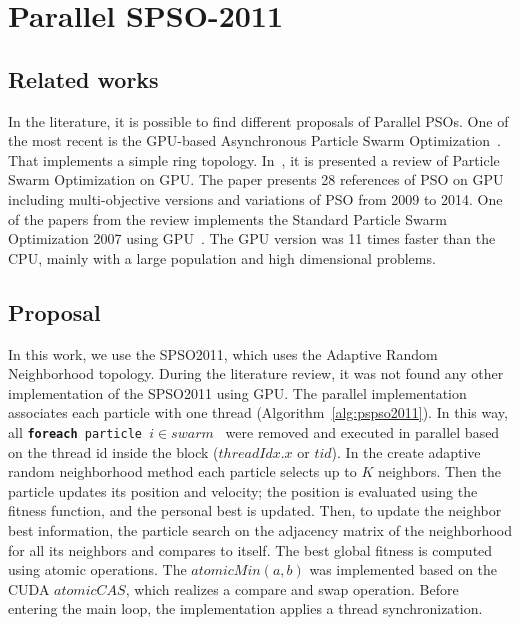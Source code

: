 \documentclass{article}
\begin{document}
    \section{Parallel SPSO-2011}

    \subsection{Related works}

    In the literature, it is possible to find different proposals of Parallel PSOs.
    One of the most recent is the GPU-based Asynchronous Particle Swarm Optimization~\cite{GPUPSO}.
    That implements a simple ring topology.
    In~\cite{ReviewGPUPSO}, it is presented a review of Particle Swarm Optimization on GPU.
    The paper presents 28 references of PSO on GPU including multi-objective versions and variations of PSO from 2009 to 2014.
    One of the papers from the review implements the Standard Particle Swarm Optimization 2007 using GPU~\cite{GPUSPSO2007}. The GPU version was 11 times faster than the CPU, mainly with a large population and high dimensional problems.

    \subsection{Proposal}

    In this work, we use the SPSO2011, which uses the Adaptive Random Neighborhood topology.  
    During the literature review, it was not found any other implementation of the SPSO2011 using GPU.
    The parallel implementation associates each particle with one thread (Algorithm~\ref{alg:pspso2011}).
    In this way, all \texttt{{\bf foreach} particle $ i \in swarm$ } were removed and executed in parallel based on the thread id inside the block ($threadIdx.x$ or $tid$).
    In the create adaptive random neighborhood method each particle selects up to $K$ neighbors. Then the particle updates its position and velocity; the position is evaluated using the fitness function, and the personal best is updated.
    Then, to update the neighbor best information, the particle search on the adjacency matrix of the neighborhood for all its neighbors and compares to itself.
    The best global fitness is computed using atomic operations. The $atomicMin(a, b)$ was implemented based on the CUDA $atomicCAS$, which realizes a compare and swap operation.
    Before entering the main loop, the implementation applies a thread synchronization.
\end{document}
